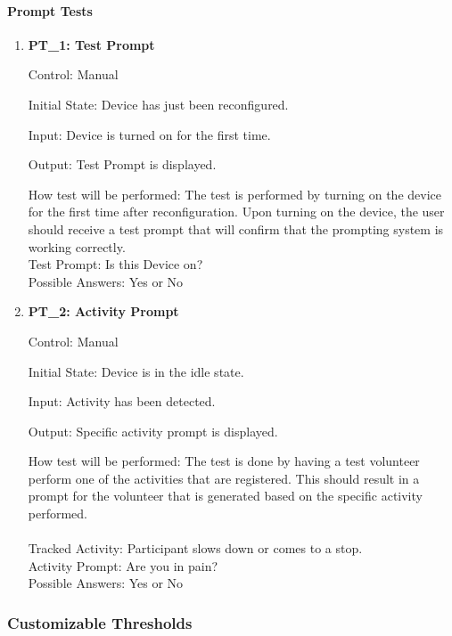 \documentclass[12pt, titlepage]{article}
\begin{document}
\paragraph{Prompt Tests}
\begin{enumerate}
	\item{\textbf{PT\_1: Test Prompt} \\}\label{PT1}
	
		Control: Manual 
							
		Initial State: Device has just been reconfigured.
							
		Input: Device is turned on for the first time.
		
		Output: Test Prompt is displayed.

		How test will be performed: The test is performed by turning on the device for the first time after reconfiguration. Upon turning on the device, the user should receive a test prompt that will confirm that the 				prompting system is working correctly.\\
		Test Prompt: Is this Device on?\\
		Possible Answers: Yes or No
		
	\item{\textbf{PT\_2: Activity Prompt} \\}\label{PT2}
	
		Control: Manual 
							
		Initial State: Device is in the idle state.
							
		Input: Activity has been detected.
		
		Output: Specific activity prompt is displayed.
							
		How test will be performed: The test is done by having a test volunteer perform one of the activities that are registered. This should result in a prompt for the volunteer that is generated based on the 					specific activity performed.\\\\
		Tracked Activity: Participant slows down or comes to a stop.\\
		Activity Prompt: Are you in pain?\\
		Possible Answers: Yes or No
\end{enumerate}

\subsubsection{Customizable Thresholds}
\end{document}

